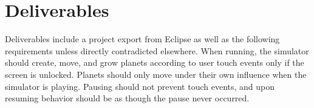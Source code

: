 \section{Deliverables}

Deliverables include a project export from Eclipse as well as the following requirements unless directly contradicted elsewhere.
When running, the simulator should create, move, and grow planets according to user touch events only if the screen is unlocked.
Planets should only move under their own influence when the simulator is playing.
Pausing should not prevent touch events, and upon resuming behavior should be as though the pause never occurred.